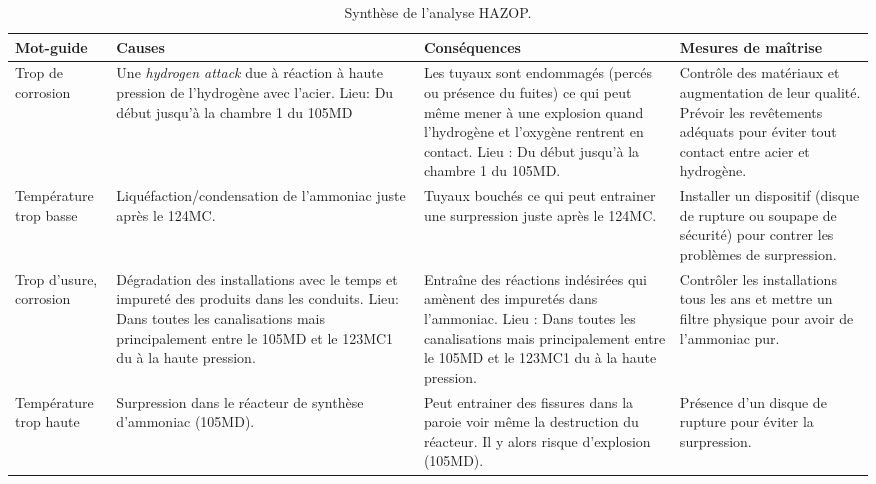 	\begin{table}[ht!]
		\centering
		{
			\begin{tabular}{|p{0.25\textwidth}|p{}|p{}|p{}|}
				\rowcolor{Gray} Mot-guide		& Causes 	& Conséquences 	&	Mesures de maîtrise 	\\
				\hline
				Trop de corrosion		 
				& Une \textit{hydrogen attack} due à réaction à haute pression 
				de l'hydrogène avec l'acier. Lieu: Du début jusqu'à la chambre 1 du 105MD
				& Les tuyaux sont endommagés (percés ou présence du fuites) ce qui peut
				même mener à une explosion quand l'hydrogène et l'oxygène rentrent en contact. 
				Lieu : Du début jusqu'à la chambre 1 du 105MD.	 
				& Contrôle des matériaux	et augmentation de leur qualité. Prévoir les revêtements adéquats pour éviter tout contact entre acier et hydrogène. 	\\				
				\hline
				Température	trop basse	
				& Liquéfaction/condensation de l'ammoniac juste après le 124MC.	
				& Tuyaux bouchés ce qui peut entrainer une surpression juste après le 124MC.  
				& Installer un dispositif (disque de rupture ou soupape de sécurité) pour contrer
					les problèmes de surpression. \\
				\hline 
				Trop d'usure, corrosion	
				& Dégradation des installations avec le temps et impureté des produits 
				dans les conduits. Lieu: Dans toutes les canalisations mais principalement entre 
				le 105MD et le 123MC1 du à la haute pression.	
				& Entraîne des réactions indésirées qui amènent des impuretés dans l'ammoniac. 
				Lieu : Dans toutes les canalisations mais principalement entre le 105MD et le 123MC1 
				du à la haute pression.	 
				&  Contrôler les installations tous les ans et mettre un filtre physique pour avoir de l'ammoniac pur.	\\
				\hline
				Température trop haute	
				&	Surpression dans le réacteur de synthèse d'ammoniac (105MD).				
				& Peut entrainer des fissures dans la paroie voir même la destruction du réacteur. 
				Il y alors risque d'explosion (105MD).							
				& Présence d'un disque de rupture pour éviter la surpression. \\
				\hline
			\end{tabular}
		}
		\caption{Synthèse de l'analyse HAZOP.}
	\end{table}


